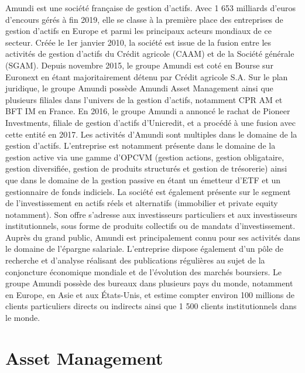 Amundi est une société française de gestion d'actifs. Avec 1 653 milliards d'euros d'encours gérés à fin 2019, elle se classe à la première place des entreprises de gestion d'actifs en Europe et parmi les principaux acteurs mondiaux de ce secteur.
Créée le 1er janvier 2010, la société est issue de la fusion entre les activités de gestion d'actifs du Crédit agricole (CAAM) et de la Société générale (SGAM). Depuis novembre 2015, le groupe Amundi est coté en Bourse sur Euronext en étant majoritairement détenu par Crédit agricole S.A.
Sur le plan juridique, le groupe Amundi possède Amundi Asset Management ainsi que plusieurs filiales dans l'univers de la gestion d'actifs, notamment CPR AM et BFT IM en France. En 2016, le groupe Amundi a annoncé le rachat de Pioneer Investments, filiale de gestion d'actifs d'Unicredit, et a procédé à une fusion avec cette entité en 2017.
Les activités d'Amundi sont multiples dans le domaine de la gestion d'actifs. L'entreprise est notamment présente dans le domaine de la gestion active via une gamme d'OPCVM (gestion actions, gestion obligataire, gestion diversifiée, gestion de produits structurés et gestion de trésorerie) ainsi que dans le domaine de la gestion passive en étant un émetteur d'ETF et un gestionnaire de fonds indiciels. La société est également présente sur le segment de l'investissement en actifs réels et alternatifs (immobilier et private equity notamment). Son offre s’adresse aux investisseurs particuliers et aux investisseurs institutionnels, sous forme de produits collectifs ou de mandats d’investissement. Auprès du grand public, Amundi est principalement connu pour ses activités dans le domaine de l'épargne salariale. L'entreprise dispose également d'un pôle de recherche et d'analyse réalisant des publications régulières au sujet de la conjoncture économique mondiale et de l'évolution des marchés boursiers.
Le groupe Amundi possède des bureaux dans plusieurs pays du monde, notamment en Europe, en Asie et aux États-Unis, et estime compter environ 100 millions de clients particuliers directs ou indirects ainsi que 1 500 clients institutionnels dans le monde.

\section{Asset Management}

